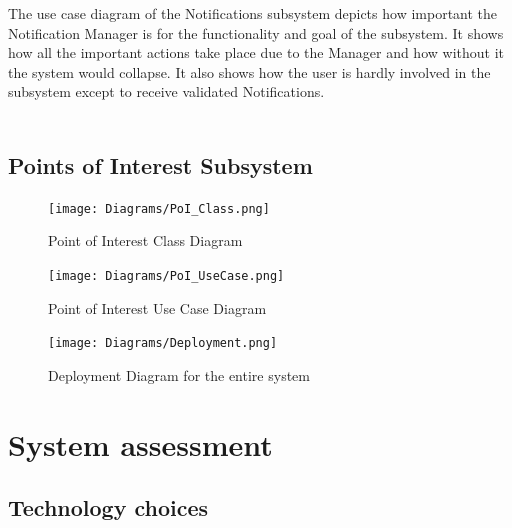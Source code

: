 \documentclass{article}
\begin{document}
				{The use case diagram of the Notifications subsystem depicts how important the Notification Manager is for the functionality and goal of the subsystem. It shows how all the important actions take place due to the Manager and how without it the system would collapse. It also shows how the user is hardly involved in the subsystem except to receive validated Notifications.\\\\}
			    

			\newpage
			\subsection{Points of Interest Subsystem}\label{subsec:points of interest}
				\begin{figure}[H]
		 \texttt{[image: Diagrams/PoI\_Class.png]}
                     \caption{Point of Interest Class Diagram}
					 \label{fig:PoI_class}
			    \end{figure}

			\begin{figure}[H]
		 \texttt{[image: Diagrams/PoI\_UseCase.png]}
                     \caption{Point of Interest Use Case Diagram}
					 \label{fig:PoI_UseCase}
			    \end{figure}

		\newpage
		\begin{figure}[H]
		 \texttt{[image: Diagrams/Deployment.png]}
			     \caption{Deployment Diagram for the entire system}
					 \label{fig:deployment}
			    \end{figure}
			    \newpage
		\section{System assessment}\label{sec:assessment }	
			\subsection{Technology choices}\label{subsec:tech choices}
			
\end{document}
